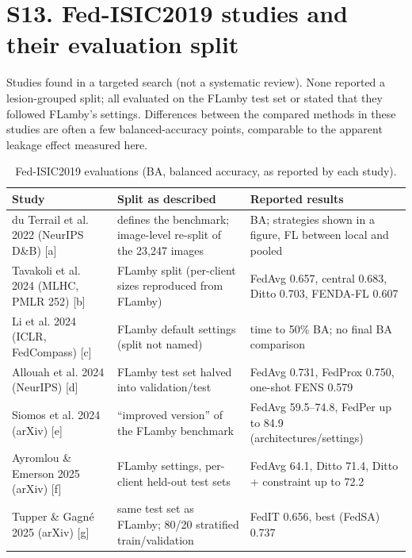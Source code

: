 \documentclass[10pt]{article}
\begin{document}
\section*{S13. Fed-ISIC2019 studies and their evaluation split}
Studies found in a targeted search (not a systematic review). None reported a lesion-grouped split; all evaluated on the FLamby test set or stated that they followed FLamby's settings. Differences between the compared methods in these studies are often a few balanced-accuracy points, comparable to the apparent leakage effect measured here.
\begin{table}[!htbp]
\centering
\scriptsize
\caption{Fed-ISIC2019 evaluations (BA, balanced accuracy, as reported by each study).}
\label{tab:s13}
\begin{tabular}{@{}p{4.2cm}p{5.0cm}p{6.3cm}@{}}
\toprule
Study & Split as described & Reported results \\
\midrule
du Terrail et al. 2022 (NeurIPS D\&B) [a] & defines the benchmark; image-level re-split of the 23,247 images & BA; strategies shown in a figure, FL between local and pooled \\
Tavakoli et al. 2024 (MLHC, PMLR 252) [b] & FLamby split (per-client sizes reproduced from FLamby) & FedAvg 0.657, central 0.683, Ditto 0.703, FENDA-FL 0.607 \\
Li et al. 2024 (ICLR, FedCompass) [c] & FLamby default settings (split not named) & time to 50\% BA; no final BA comparison \\
Allouah et al. 2024 (NeurIPS) [d] & FLamby test set halved into validation/test & FedAvg 0.731, FedProx 0.750, one-shot FENS 0.579 \\
Siomos et al. 2024 (arXiv) [e] & ``improved version'' of the FLamby benchmark & FedAvg 59.5--74.8, FedPer up to 84.9 (architectures/settings) \\
Ayromlou \& Emerson 2025 (arXiv) [f] & FLamby settings, per-client held-out test sets & FedAvg 64.1, Ditto 71.4, Ditto + constraint up to 72.2 \\
Tupper \& Gagn\'e 2025 (arXiv) [g] & same test set as FLamby; 80/20 stratified train/validation & FedIT 0.656, best (FedSA) 0.737 \\
\bottomrule
\end{tabular}
\end{table}
\end{document}
